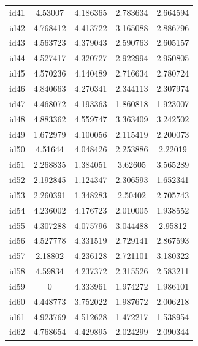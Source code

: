 \documentclass[entropy,article,submit,moreauthors,LaTeX and dvi2pdf]{Definitions/mdpi}
\begin{document}
\begin{center}
\begin{longtable}{ccccc}
id41      & 4.53007   & 4.186365       & 2.783634          & 2.664594          \\
id42      & 4.768412  & 4.413722       & 3.165088          & 2.886796          \\
id43      & 4.563723  & 4.379043       & 2.590763          & 2.605157          \\
id44      & 4.527417  & 4.320727       & 2.922994          & 2.950805          \\
id45      & 4.570236  & 4.140489       & 2.716634          & 2.780724          \\
id46      & 4.840663  & 4.270341       & 2.344113          & 2.307974          \\
id47      & 4.468072  & 4.193363       & 1.860818          & 1.923007          \\
id48      & 4.883362  & 4.559747       & 3.363409          & 3.242502          \\
id49      & 1.672979  & 4.100056       & 2.115419          & 2.200073          \\
id50      & 4.51644   & 4.048426       & 2.253886          & 2.22019           \\
id51      & 2.268835  & 1.384051       & 3.62605           & 3.565289          \\
id52      & 2.192845  & 1.124347       & 2.306593          & 1.652341          \\
id53      & 2.260391  & 1.348283       & 2.50402           & 2.705743          \\
id54      & 4.236002  & 4.176723       & 2.010005          & 1.938552          \\
id55      & 4.307288  & 4.075796       & 3.044488          & 2.95812           \\
id56      & 4.527778  & 4.331519       & 2.729141          & 2.867593          \\
id57      & 2.18802   & 4.236128       & 2.721101          & 3.180322          \\
id58      & 4.59834   & 4.237372       & 2.315526          & 2.583211          \\
id59      & 0         & 4.333961       & 1.974272          & 1.986101          \\
id60      & 4.448773  & 3.752022       & 1.987672          & 2.006218          \\
id61      & 4.923769  & 4.512628       & 1.472217          & 1.538954          \\
id62      & 4.768654  & 4.429895       & 2.024299          & 2.090344          \\

\end{longtable}
\end{center}
\end{document}
